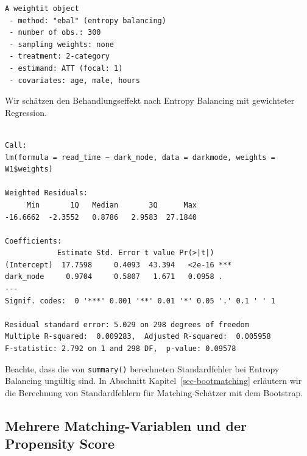 \documentclass[
  a4paper,
  DIV=11,
  oneside]{scrreprt}
\newenvironment{Shaded}{\begin{snugshade}}{\end{snugshade}}
\newcommand{\AttributeTok}[1]{\textcolor[rgb]{0.40,0.45,0.13}{#1}}
\newcommand{\CommentTok}[1]{\textcolor[rgb]{0.37,0.37,0.37}{#1}}
\newcommand{\FunctionTok}[1]{\textcolor[rgb]{0.28,0.35,0.67}{#1}}
\newcommand{\NormalTok}[1]{\textcolor[rgb]{0.00,0.23,0.31}{#1}}
\newcommand{\OtherTok}[1]{\textcolor[rgb]{0.00,0.23,0.31}{#1}}
\newcommand{\SpecialCharTok}[1]{\textcolor[rgb]{0.37,0.37,0.37}{#1}}
\begin{document}
\begin{verbatim}
A weightit object
 - method: "ebal" (entropy balancing)
 - number of obs.: 300
 - sampling weights: none
 - treatment: 2-category
 - estimand: ATT (focal: 1)
 - covariates: age, male, hours
\end{verbatim}

Wir schätzen den Behandlungseffekt nach Entropy Balancing mit
gewichteter Regression.

\begin{Shaded}
\end{Shaded}

\begin{verbatim}

Call:
lm(formula = read_time ~ dark_mode, data = darkmode, weights = W1$weights)

Weighted Residuals:
     Min       1Q   Median       3Q      Max 
-16.6662  -2.3552   0.8786   2.9583  27.1840 

Coefficients:
            Estimate Std. Error t value Pr(>|t|)    
(Intercept)  17.7598     0.4093  43.394   <2e-16 ***
dark_mode     0.9704     0.5807   1.671   0.0958 .  
---
Signif. codes:  0 '***' 0.001 '**' 0.01 '*' 0.05 '.' 0.1 ' ' 1

Residual standard error: 5.029 on 298 degrees of freedom
Multiple R-squared:  0.009283,  Adjusted R-squared:  0.005958 
F-statistic: 2.792 on 1 and 298 DF,  p-value: 0.09578
\end{verbatim}

Beachte, dass die von \texttt{summary()} berechneten Standardfehler bei
Entropy Balancing ungültig sind. In Abschnitt
Kapitel~\ref{sec-bootmatching} erläutern wir die Berechnung von
Standardfehlern für Matching-Schätzer mit dem Bootstrap.

\subsection{Mehrere Matching-Variablen und der Propensity
Score}\label{sec-PSM}
\end{document}
